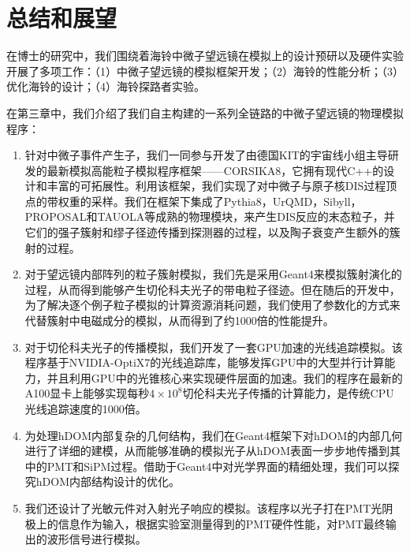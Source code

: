 \chapter{总结和展望}
\label{chap:conclusion}

在博士的研究中，我们围绕着海铃中微子望远镜在模拟上的设计预研以及硬件实验开展了多项工作：（1）中微子望远镜的模拟框架开发；（2）海铃的性能分析；（3）优化海铃的设计；（4）海铃探路者实验。

在第三章中，我们介绍了我们自主构建的一系列全链路的中微子望远镜的物理模拟程序：
\begin{enumerate}
    \item 针对中微子事件产生子，我们一同参与开发了由德国KIT的宇宙线小组主导研发的最新模拟高能粒子模拟程序框架——CORSIKA8，它拥有现代C++的设计和丰富的可拓展性。利用该框架，我们实现了对中微子与原子核DIS过程顶点的带权重的采样。我们在框架下集成了\textsf{Pythia8}，\textsf{UrQMD}，\textsf{Sibyll}，\textsf{PROPOSAL}和\textsf{TAUOLA}等成熟的物理模块，来产生DIS反应的末态粒子，并它们的强子簇射和缪子径迹传播到探测器的过程，以及陶子衰变产生额外的簇射的过程。
    \item 对于望远镜内部阵列的粒子簇射模拟，我们先是采用\textsf{Geant4}来模拟簇射演化的过程，从而得到能够产生切伦科夫光子的带电粒子径迹。但在随后的开发中，为了解决逐个例子粒子模拟的计算资源消耗问题，我们使用了参数化的方式来代替簇射中电磁成分的模拟，从而得到了约1000倍的性能提升。
    \item 对于切伦科夫光子的传播模拟，我们开发了一套GPU加速的光线追踪模拟。该程序基于\textsf{NVIDIA-OptiX7}的光线追踪库，能够发挥GPU中的大型并行计算能力，并且利用GPU中的光锥核心来实现硬件层面的加速。我们的程序在最新的A100显卡上能够实现每秒$4\times10^8$切伦科夫光子传播的计算能力，是传统CPU光线追踪速度的1000倍。
    \item 为处理hDOM内部复杂的几何结构，我们在\textsf{Geant4}框架下对hDOM的内部几何进行了详细的建模，从而能够准确的模拟光子从hDOM表面一步步地传播到其中的PMT和SiPM过程。借助于\textsf{Geant4}中对光学界面的精细处理，我们可以探究hDOM内部结构设计的优化。
    \item 我们还设计了光敏元件对入射光子响应的模拟。该程序以光子打在PMT光阴极上的信息作为输入，根据实验室测量得到的PMT硬件性能，对PMT最终输出的波形信号进行模拟。
\end{enumerate}

